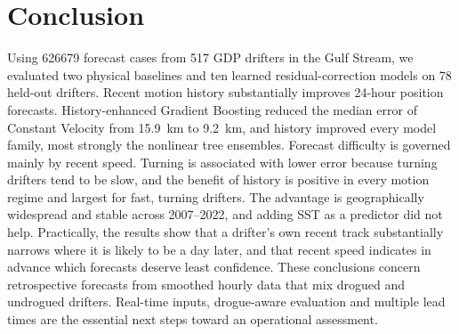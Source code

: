 \section{Conclusion}\label{sec:conclusion}
Using \num{626679} forecast cases from 517 GDP drifters in the Gulf Stream, we evaluated two physical baselines and ten learned residual-correction models on 78 held-out drifters. Recent motion history substantially improves 24-hour position forecasts. History-enhanced Gradient Boosting reduced the median error of Constant Velocity from \SI{15.9}{km} to \SI{9.2}{km}, and history improved every model family, most strongly the nonlinear tree ensembles. Forecast difficulty is governed mainly by recent speed. Turning is associated with lower error because turning drifters tend to be slow, and the benefit of history is positive in every motion regime and largest for fast, turning drifters. The advantage is geographically widespread and stable across 2007--2022, and adding SST as a predictor did not help. Practically, the results show that a drifter's own recent track substantially narrows where it is likely to be a day later, and that recent speed indicates in advance which forecasts deserve least confidence. These conclusions concern retrospective forecasts from smoothed hourly data that mix drogued and undrogued drifters. Real-time inputs, drogue-aware evaluation and multiple lead times are the essential next steps toward an operational assessment.
